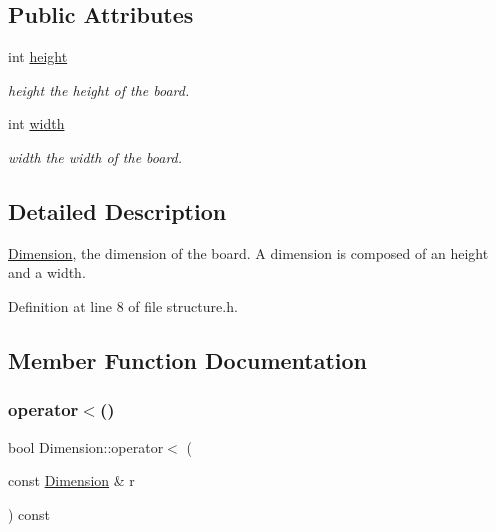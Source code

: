 \subsection*{Public Attributes}
\begin{DoxyCompactItemize}
\item 
\mbox{\label{struct_dimension_ae6458fe2808cda65f04a61d532bd45df}} 
int \hyperlink{struct_dimension_ae6458fe2808cda65f04a61d532bd45df}{height}
\begin{DoxyCompactList}\small\item\em height the height of the board. \end{DoxyCompactList}\item 
\mbox{\label{struct_dimension_a9ccec48bbada6d1b8aaa9a1e5fc60fcd}} 
int \hyperlink{struct_dimension_a9ccec48bbada6d1b8aaa9a1e5fc60fcd}{width}
\begin{DoxyCompactList}\small\item\em width the width of the board. \end{DoxyCompactList}\end{DoxyCompactItemize}


\subsection{Detailed Description}
\hyperlink{struct_dimension}{Dimension}, the dimension of the board. A dimension is composed of an height and a width. 

Definition at line 8 of file structure.\+h.



\subsection{Member Function Documentation}
\mbox{\label{struct_dimension_a193e00a30205877faa6eb2978e11894f}} 
\subsubsection{\texorpdfstring{operator$<$()}{operator<()}}
{\footnotesize\ttfamily bool Dimension\+::operator$<$ (\begin{DoxyParamCaption}\item[{const \hyperlink{struct_dimension}{Dimension} \&}]{r }\end{DoxyParamCaption}) const\hspace{0.3cm}{\ttfamily [inline]}}



